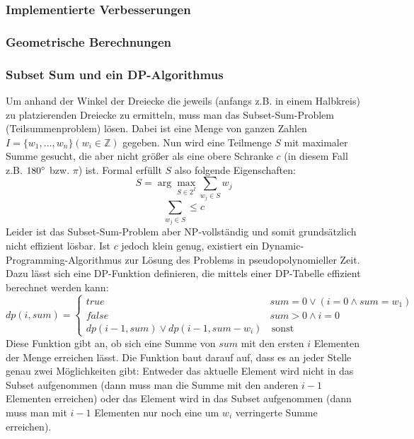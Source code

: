 \documentclass[a4paper, notitlepage, 12pt]{scrartcl}
\begin{document}
\subsubsection{Implementierte Verbesserungen}
\subsubsection{Geometrische Berechnungen}
  \subsubsection{Subset Sum und ein DP-Algorithmus}
  Um anhand der Winkel der Dreiecke die jeweils (anfangs z.B. in einem Halbkreis) zu platzierenden Dreiecke zu ermitteln, muss man das Subset-Sum-Problem (Teilsummenproblem) lösen. Dabei ist eine Menge von ganzen Zahlen $I = \{w_1,...,w_n\} (w_i \in \mathbb{Z})$ gegeben. Nun wird eine Teilmenge $S$ mit maximaler Summe gesucht, die aber nicht größer als eine obere Schranke $c$ (in diesem Fall z.B. $180\degree$ bzw. $\pi$) ist. Formal erfüllt $S$ also folgende Eigenschaften:
  \begin{equation}
  S = \arg \max_{S \in 2^I} \sum_{w_j \in S} w_j
  \end{equation}
  \begin{equation}
  \sum_{w_j \in S} \leq c
  \end{equation}
  Leider ist das Subset-Sum-Problem aber NP-vollständig und somit grundsätzlich nicht effizient lösbar. Ist $c$ jedoch klein genug, existiert ein Dynamic-Programming-Algorithmus zur Lösung des Problems in pseudopolynomieller Zeit.\cite{Src:dpsum} Dazu lässt sich eine DP-Funktion definieren, die mittels einer DP-Tabelle effizient berechnet werden kann:
  \begin{equation}
  dp(i,sum) = 
  \begin{cases}
  true & sum = 0 \vee (i = 0 \wedge sum = w_1) \\
  false & sum > 0 \wedge i = 0 \\
  dp(i-1,sum) \vee dp(i-1,sum-w_i) & \, \text{sonst}
  \end{cases}
  \end{equation}
  Diese Funktion gibt an, ob sich eine Summe von $sum$ mit den ersten $i$ Elementen der Menge erreichen lässt. Die Funktion baut darauf auf, dass es an jeder Stelle genau zwei Möglichkeiten gibt: Entweder das aktuelle Element wird nicht in das Subset aufgenommen (dann muss man die Summe mit den anderen $i-1$ Elementen erreichen) oder das Element wird in das Subset aufgenommen (dann muss man mit $i-1$ Elementen nur noch eine um $w_i$ verringerte Summe erreichen). \\ \\
\end{document}
